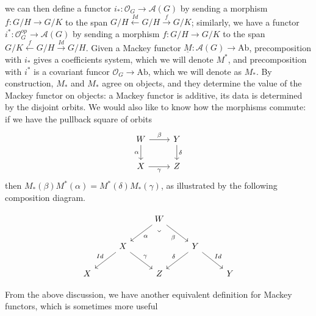 \documentclass{article}
\theoremstyle{definition}
\theoremstyle{definition}
\theoremstyle{definition}
\theoremstyle{definition}
\theoremstyle{definition}
\theoremstyle{definition}
\theoremstyle{definition}
\begin{document}
we can then define a functor $i_*:\mathcal{O}_G\to \mathcal{A}(G)$ by sending a morphism $f:G/H\to G/K$ to the span $G/H\xleftarrow{Id}G/H\xrightarrow{f}G/K$; similarly, we have a functor $i^*:\mathcal{O}^{op}_G\to \mathcal{A}(G)$ by sending a morphism $f:G/H\to G/K$ to the span $G/K\xleftarrow{f}G/H\xrightarrow{Id}G/H$. Given a Mackey functor $\underline{M}: \mathcal{A}(G)\to \textrm{Ab}$, precomposition with $i_*$ gives a coefficients system, which we will denote $M^*$, and precomposition with $i^*$ is a covariant funcor $\mathcal{O}_G\to \textrm{Ab}$, which we will denote as $M_*$. By construction, $M_*$ and $M_*$ agree on objects, and they determine the value of the Mackey functor on objects: a Mackey functor is additive, its data is determined by the disjoint orbits. We would also like to know how the morphisms commute: if we have the pullback square of orbits
\[\begin{tikzcd}
	W & Y \\
	X & Z
	\arrow["\beta", from=1-1, to=1-2]
	\arrow["\alpha"', from=1-1, to=2-1]
	\arrow["\delta", from=1-2, to=2-2]
	\arrow["\gamma"', from=2-1, to=2-2]
\end{tikzcd}\]
then $M_*(\beta)M^*(\alpha)=M^*(\delta)M_*(\gamma)$, as illustrated by the following composition diagram. 

\[\begin{tikzcd}
	&& W \\
	& X && Y \\
	X && Z & {} & Y
	\arrow["\alpha", from=1-3, to=2-2]
	\arrow["\beta"', from=1-3, to=2-4]
	\arrow["\lrcorner"{anchor=center, pos=0.125, rotate=-45}, draw=none, from=1-3, to=3-3]
	\arrow["Id"', from=2-2, to=3-1]
	\arrow["\gamma", from=2-2, to=3-3]
	\arrow["\delta"', from=2-4, to=3-3]
	\arrow["Id", from=2-4, to=3-5]
\end{tikzcd}\]

From the above discussion, we have another equivalent definition for Mackey functors, which is sometimes more useful 
\end{document}
